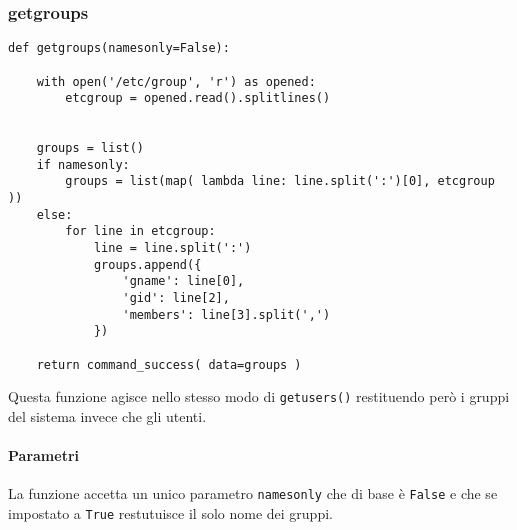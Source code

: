 \documentclass[11pt]{article}
\begin{document}
\subsubsection{getgroups}\label{getgroups}
\begin{lstlisting}
def getgroups(namesonly=False):

    with open('/etc/group', 'r') as opened:
        etcgroup = opened.read().splitlines()


    groups = list()
    if namesonly:
        groups = list(map( lambda line: line.split(':')[0], etcgroup ))
    else:
        for line in etcgroup:
            line = line.split(':')
            groups.append({
                'gname': line[0],
                'gid': line[2],
                'members': line[3].split(',')
            })
    
    return command_success( data=groups )
\end{lstlisting}
Questa funzione agisce nello stesso modo di \texttt{getusers()} restituendo però i gruppi del sistema invece che gli utenti.

\paragraph{Parametri}
La funzione accetta un unico parametro \texttt{namesonly} che di base è \texttt{False} e che se impostato a \texttt{True}
restutuisce il solo nome dei gruppi.
\end{document}
